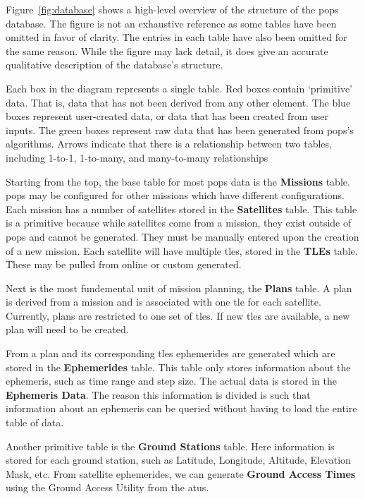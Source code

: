 Figure~\ref{fig:database} shows a high-level overview of the structure of the
\gls{pops} database. The figure is not an exhaustive reference as some tables
have been omitted in favor of clarity. The entries in each table have also been
omitted for the same reason. While the figure may lack detail, it does give an
accurate qualitative description of the database's structure. 

Each box in the diagram represents a single table. Red boxes contain
`primitive' data. That is, data that has not been derived from any other
element. The blue boxes represent user-created data, or data that has been
created from user inputs. The green boxes represent raw data that has been
generated from \gls{pops}'s algorithms. Arrows indicate that there is a
relationship between two tables, including 1-to-1, 1-to-many, and many-to-many
relationships

Starting from the top, the base table for most \gls{pops} data is the
\textbf{Missions} table. \gls{pops} may be configured for other missions which
have different configurations. Each mission has a number of satellites stored
in the \textbf{Satellites} table. This table is a primitive because while
satellites come from a mission, they exist outside of \gls{pops} and cannot be
generated. They must be manually entered upon the creation of a new mission.
Each satellite will have multiple \glspl{tle}, stored in the \textbf{TLEs}
table. These may be pulled from online or custom generated.

Next is the most fundemental unit of mission planning, the \textbf{Plans}
table. A plan is derived from a mission and is associated with one \gls{tle}
for each satellite. Currently, plans are restricted to one set of \glspl{tle}.
If new \glspl{tle} are available, a new plan will need to be created. 

From a plan and its corresponding \glspl{tle} ephemerides are generated which
are stored in the \textbf{Ephemerides} table. This table only stores
information about the ephemeris, such as time range and step size. The actual
data is stored in the \textbf{Ephemeris Data}. The reason this information is
divided is such that information about an ephemeris can be queried without
having to load the entire table of data.

Another primitive table is the \textbf{Ground Stations} table. Here information
is stored for each ground station, such as Latitude, Longitude, Altitude,
Elevation Mask, etc. From satellite ephemerides, we can generate \textbf{Ground
Access Times} using the Ground Access Utility from the \glspl{atu}.

